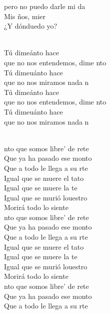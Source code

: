 \begin{cancion}
	pero no puedo darle mi da\\
	Mis ños, mier\\
	¿Y dónduedo yo?\\\jump\\
	\begin{chorus}%
	Tú dimeánto hace \\
	que no nos entendemos, dime nto \\
	Tú dimeuánto hace  \\
	que no nos miramos nada n\\
	Tú dimeánto hace  \\
	que no nos entendemos, dime nto \\
	Tú dimeuánto hace  \\
	que no nos miramos nada n\\
	\end{chorus}%
	\jump\\
	nto que somos libre' de rete\\
	Que ya ha pasado ese monto\\
	Que a todo le llega a su rte\\
	Igual que se muere el tato\\
	Igual que se muere la te\\
	Igual que se murió louestro\\
	Morirá todo lo siente\\
	nto que somos libre' de rete\\
	Que ya ha pasado ese monto\\
	Que a todo le llega a su rte\\
	Igual que se muere el tato\\
	Igual que se muere la te\\
	Igual que se murió louestro\\
	Morirá todo lo siente\\
	nto que somos libre' de rete\\
	Que ya ha pasado ese monto\\
	Que a todo le llega a su rte\\

\end{cancion}
